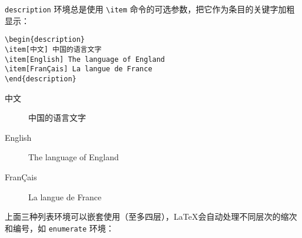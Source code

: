 \verb|description| 环境总是使用 \verb|\item| 命令的可选参数，把它作为条目的关键字加粗显示：

\begin{minipage}[t]{0.45\textwidth}
\begin{lstlisting}
\begin{description}
\item[中文] 中国的语言文字
\item[English] The language of England
\item[FranÇais] La langue de France
\end{description}
\end{lstlisting}
\end{minipage}
\hfill
\begin{minipage}[t]{0.45\textwidth}
    \begin{description}
        \item[中文] 中国的语言文字
        \item[English] The language of England
        \item[FranÇais] La langue de France
    \end{description}
\end{minipage}

上面三种列表环境可以嵌套使用（至多四层），\LaTeX 会自动处理不同层次的缩次和编号，如  \verb|enumerate| 环境：

